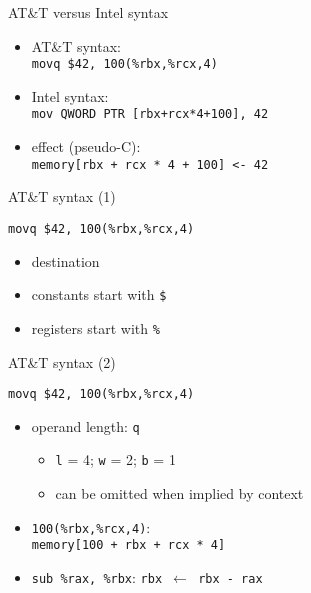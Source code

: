
\begin{frame}{AT\&T versus Intel syntax}
    \begin{itemize}
    \item AT\&T syntax: \\ {\tt movq \$42, 100(\%rbx,\%rcx,4)}
    \item Intel syntax: \\ {\tt mov QWORD PTR [rbx+rcx*4+100], 42}
    \item effect (pseudo-C): \\ {\tt memory[rbx + rcx * 4 + 100] <- 42}
    \end{itemize}
\end{frame}

\begin{frame}[fragile,label=att1]{AT\&T syntax (1)}
\begin{lstlisting}
movq $42, 100(%rbx,%rcx,4)
\end{lstlisting}
    \begin{itemize}
    \item destination 
    \item constants start with {\tt \$}
    \item registers start with {\tt \%}
    \end{itemize}
\end{frame}

\begin{frame}[fragile,label=att2]{AT\&T syntax (2)}
\begin{lstlisting}
movq $42, 100(%rbx,%rcx,4)
\end{lstlisting}
    \begin{itemize}
    \item operand length: {\tt q}
        \begin{itemize}
        \item {\tt l} = 4; {\tt w} = 2; {\tt b} = 1
        \item can be omitted when implied by context
        \end{itemize}
    \item {\tt 100(\%rbx,\%rcx,4)}: \\ {\tt memory[100 + rbx + rcx * 4]}
    \item {\tt sub \%rax, \%rbx}: {\tt rbx $\leftarrow$ rbx - rax}
    \end{itemize}
\end{frame}


